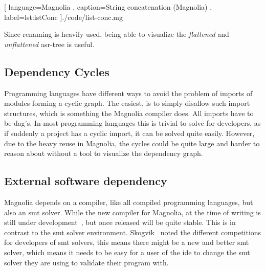 \begin{center}
  
    [ language=Magnolia
    , caption={String concatenation (Magnolia)}
    , label=lst:lstConc
    ]{./code/list-conc.mg}
\end{center}

Since renaming is heavily used, being able to visualize the \textit{flattened}
and \textit{unflattened} \gls*{asr}-tree is useful.

\subsection{Dependency Cycles}

Programming languages have different ways to avoid the problem of imports of
modules forming a cyclic graph. The easiest, is to simply disallow such import
structures, which is something the Magnolia compiler does. All imports have to be
\gls*{dag}'s. In most programming languages this is trivial to solve for
developers, as if suddenly a project has a cyclic import, it can be solved quite
easily. However, due to the heavy reuse in Magnolia, the cycles could be quite
large and harder to reason about without a tool to visualize the dependency graph.

\subsection{External software dependency}

Magnolia depends on a compiler, like all compiled programming languages, but
also an \gls*{smt} solver. While the new compiler for Magnolia, at the time of
writing is still under development~\cite{wiig}, but once released will be quite
stable. This is in contrast to the \gls*{smt} solver environment. Skogvik~\cite{beateVerification}
noted the different competitions for developers of \gls*{smt} solvers, this means
there might be a new and better \gls*{smt} solver, which means it needs to be
easy for a user of the \gls*{ide} to change the \gls*{smt} solver they are using
to validate their program with.
